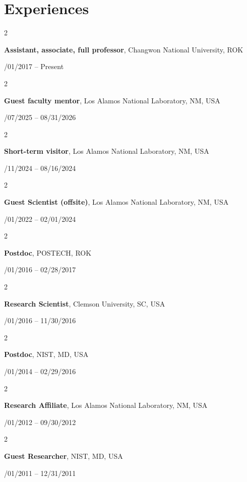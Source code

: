 \documentclass[10pt, letterpaper]{article}
\newenvironment{twocolentry}[2][]{
    \onecolentry
    \def\secondColumn{#2}
    \setcolumnwidth{\fill, 4.5 cm}
    \begin{paracol}{2}
}{
    \switchcolumn \raggedleft \secondColumn
    \end{paracol}
    \endonecolentry
} %
\begin{document}
    \section{Experiences}
        \begin{twocolentry}{03/01/2017 – Present}
            \textbf{Assistant, associate, full professor}, Changwon National University, ROK
        \end{twocolentry}
        \vspace{0.10 cm}
        \begin{twocolentry}{10/07/2025 – 08/31/2026}
            \textbf{Guest faculty mentor}, Los Alamos National Laboratory, NM, USA
        \end{twocolentry}
        \vspace{0.10 cm}
        \begin{twocolentry}{07/11/2024 – 08/16/2024}
            \textbf{Short-term visitor}, Los Alamos National Laboratory, NM, USA
        \end{twocolentry}
        \vspace{0.10 cm}
        \begin{twocolentry}{02/01/2022 – 02/01/2024}
            \textbf{Guest Scientist (offsite)}, Los Alamos National Laboratory, NM, USA
        \end{twocolentry}
        \vspace{0.10 cm}
        \begin{twocolentry}{12/01/2016 – 02/28/2017}
            \textbf{Postdoc}, POSTECH, ROK
        \end{twocolentry}
        \vspace{0.10 cm}
        \begin{twocolentry}{03/01/2016 – 11/30/2016}
            \textbf{Research Scientist}, Clemson University, SC, USA
        \end{twocolentry}
        \vspace{0.10 cm}
        \begin{twocolentry}{03/01/2014 – 02/29/2016}
            \textbf{Postdoc}, NIST, MD, USA
        \end{twocolentry}
        \vspace{0.10 cm}
        \begin{twocolentry}{04/01/2012 – 09/30/2012}
            \textbf{Research Affiliate}, Los Alamos National Laboratory, NM, USA
        \end{twocolentry}
        \vspace{0.10 cm}
        \begin{twocolentry}{06/01/2011 – 12/31/2011}
            \textbf{Guest Researcher}, NIST, MD, USA
        \end{twocolentry}
        \vspace{0.10 cm}
\end{document}
